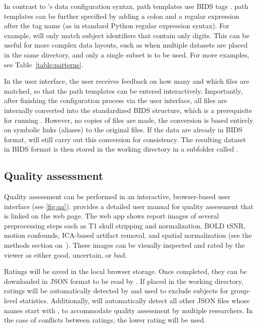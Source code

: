 

In contrast to 's data configuration syntax,  path templates use BIDS tags \parencite{gorgolewski2016b}.  path templates can be further specified by adding a colon and a regular expression after the tag name (as in standard Python regular expression syntax). For example,  will only match subject identifiers that contain only digits. This can be useful for more complex data layouts, such as when multiple datasets are placed in the same directory, and only a single subset is to be used. For more examples, see Table~\ref{table:patterns}.

In the  user interface, the user receives feedback on how many and which files are matched, so that the path templates can be entered interactively. Importantly, after finishing the configuration process via the user interface, all files are internally converted into the standardized BIDS structure, which is a prerequisite for running . However, no copies of files are made, the conversion is based entirely on symbolic links (aliases) to the original files. If the data are already in BIDS format,  will still carry out this conversion for consistency. The resulting dataset in BIDS format is then stored in the working directory in a subfolder called .

\subsection{Quality assessment}

Quality assessment can be performed in an interactive, browser-based user interface (see \autoref{fig:qa}).  provides a detailed user manual for quality assessment that is linked on the web page. The web app shows report images of several preprocessing steps such as T1 skull stripping and normalization, BOLD tSNR, motion confounds, ICA-based artifact removal, and spatial normalization (see the methods section on~). These images can be visually inspected and rated by the viewer as either good, uncertain, or bad.

Ratings will be saved in the local browser storage. Once completed, they can be downloaded in JSON format to be read by . If placed in the working directory, ratings will be automatically detected by  and used to exclude subjects for group-level statistics. Additionally,  will automatically detect all other JSON files whose names start with , to accommodate quality assessment by multiple researchers. In the case of conflicts between ratings, the lower rating will be used.

